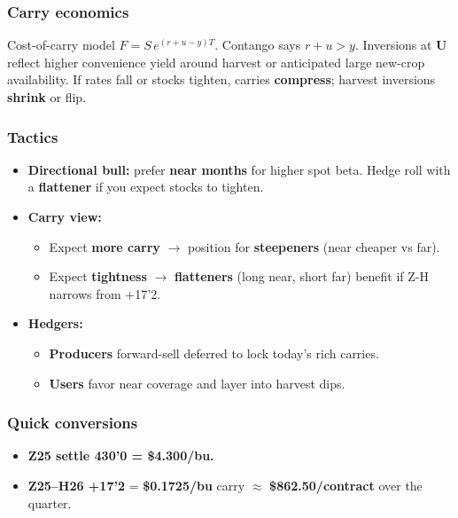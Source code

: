 \documentclass[11pt,a4paper]{article} %
\begin{document}
\subsubsection*{Carry economics}

Cost-of-carry model $F=S\,e^{(r+u-y)T}$. Contango says $r+u>y$. Inversions at \textbf{U} reflect higher convenience yield around harvest or anticipated large new-crop availability. If rates fall or stocks tighten, carries \textbf{compress}; harvest inversions \textbf{shrink} or flip.

\subsubsection*{Tactics}

\begin{itemize}
  \item \textbf{Directional bull:} prefer \textbf{near months} for higher spot beta. Hedge roll with a \textbf{flattener} if you expect stocks to tighten.
  \item \textbf{Carry view:}
    \begin{itemize}
      \item Expect \textbf{more carry} $\rightarrow$ position for \textbf{steepeners} (near cheaper vs far).
      \item Expect \textbf{tightness} $\rightarrow$ \textbf{flatteners} (long near, short far) benefit if Z-H narrows from +17'2.
    \end{itemize}
  \item \textbf{Hedgers:}
    \begin{itemize}
      \item \textbf{Producers} forward-sell deferred to lock today’s rich carries.
      \item \textbf{Users} favor near coverage and layer into harvest dips.
    \end{itemize}
\end{itemize}

\subsubsection*{Quick conversions}

\begin{itemize}
  \item \textbf{Z25 settle 430'0 = \$4.300/bu.}
  \item \textbf{Z25--H26 +17'2} = \textbf{\$0.1725/bu} carry $\approx$ \textbf{\$862.50/contract} over the quarter.
\end{itemize}
\end{document}
